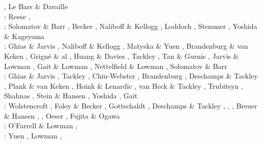 \begin{scriptsize}
                  \cite{scbh04}, Le Bars \& Davaille \cite{leda04,leda04b} \\
\twothousandfive: Reese \etal \cite{resb05}, \cite{taxn05}
                  \cite{bupc05}\cite{grlt05}
                  \cite{lemj05}\cite{kogk05}
                  \cite{mczh05b}\cite{vary05}
                  \cite{nata05}\cite{nabu05}
                  \cite{chob05}\cite{phbu05}
                  \cite{hosh05}\\
\twothousandsix: Solomatov \& Barr \cite{soba06}, Becker \cite{beck06}, Naliboff \& Kellogg \cite{nake06},
                 Loddoch \etal \cite{losh06}, Stemmer \etal \cite{sthh06}, Yoshida \& Kageyama \cite{yoka06}\\
\twothousandseven: Ghias \& Jarvis \cite{ghja07}, Naliboff \& Kellogg \cite{nake07}, 
                   Matyska \& Yuen \cite{mayu07}, Brandenburg \& van Keken \cite{brva07a,brva07b},
                   Grign\'e \& al \cite{grlt07,grlt07b}, Huang \& Davies \cite{huda07},
                   Tackley \etal \cite{tanh07}, Tan \& Gurnis \cite{tagu07}, 
                   Jarvis \& Lowman \cite{jalo07}, Gait \& Lowman \cite{galo07,galo07b}, 
                   Nettelfield \& Lowman \cite{nelo07}, Solomatov \& Barr \cite{soba07}\\
\twothousandeight: Ghias \& Jarvis \cite{ghja08}, Tackley \cite{tack08,tack08b},
                   Chiu-Webster \etal \cite{chhl08}, Brandenburg \etal \cite{brhv08},
                   Deschamps \& Tackley \cite{deta08}, Plank \& van Keken \cite{plva08},
                   Hoink \& Lenardic \cite{hole08}, van Heck \& Tackley \cite{vata08},
                   Trubitsyn \etal \cite{trkr08}, Shahnas \etal \cite{shlj08},
                   Stein \& Hansen \cite{stha08}, Yoshida \cite{yosh08}, Gait \etal \cite{galg08}\\
\twothousandnine: Wolstencroft \etal \cite{wodd09}, Foley \& Becker \cite{fobe09},
                  Gottschaldt \etal \cite{gows09}, Deschamps \& Tackley \cite{deta09},
                  \cite{onlj09}\cite{wazh09},
                  \cite{vavv09}, Breuer \& Hansen \cite{brha09},
                  \cite{scbs09b}, Oeser \etal \cite{oebm09},
                  Fujita \& Ogawa \cite{fuog09}\\
\twothousandten: O'Farrell \& Lowman \cite{oflo10}, \cite{bumb10}
                 \cite{detn10}\cite{yayh10}
                 \cite{nata10}\cite{hole10}
                 \cite{zhzl10}\cite{vayb10}
                 \cite{brmw10}\\
\twothousandeleven: Yuen \etal \cite{yutc11}, Lowman \cite{lowm11},

\end{scriptsize}
